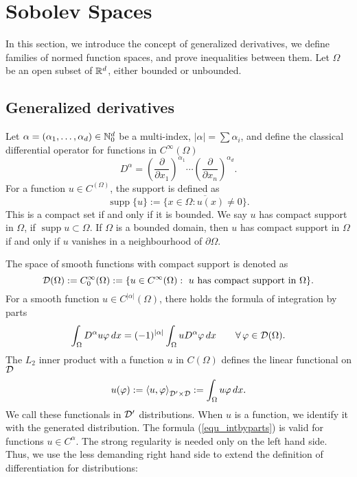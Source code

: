 \chapter{Sobolev Spaces}
\label{sec_sobolev}
%
In this section, we introduce the concept of generalized derivatives, we
define families of normed function spaces, and prove inequalities between
them.
Let $\Omega$ be an open subset of ${\mathbb R}^d$, either bounded or unbounded.

\section{Generalized derivatives}

Let $\alpha = (\alpha_1, \ldots , \alpha_d) \in {\mathbb N}_0^d$ be a multi-index,
$| \alpha | = \sum \alpha_i$, 
and define the classical differential operator for functions in $C^\infty (\Omega)$
$$
D^\alpha = 
        \left( \frac{\partial}{\partial x_1} \right)^{\alpha_1} \cdots
        \left( \frac{\partial}{\partial x_n} \right)^{\alpha_d}.
$$
%
For a function $u \in C^(\Omega)$, the support is defined as 
$$
\operatorname{supp} \{ u \} := \overline{ \{ x \in \Omega : u(x) \neq 0 \} }.
$$
This is a compact set if and only if it is bounded. We say $u$ has
compact support in $\Omega$, if $\operatorname{supp} u \subset \Omega$.
If $\Omega$ is a bounded domain, then $u$ has compact support in $\Omega$
if and only if $u$ vanishes in a neighbourhood of $\partial \Omega$.

\medskip
\noindent
The space of smooth functions with compact support is denoted as
\begin{equation}
{\cal D} (\Omega) := C_0^\infty (\Omega) := 
\{ u \in C^\infty(\Omega) : \mbox{ $u$ has compact support in $\Omega$} \}.
\end{equation}
%
For a smooth function $u \in C^{|\alpha|}(\Omega)$, there holds the
formula of integration by parts
\begin{equation} \label{equ_intbyparts}
\int_\Omega D^\alpha u \varphi \, dx = (-1)^{|\alpha|} \int_\Omega u D^\alpha \varphi \, dx 
\qquad \forall \, \varphi \in {\cal D}(\Omega).
\end{equation}
The $L_2$ inner product with a function $u$ in $C(\Omega)$ defines the linear
functional on ${\cal D}$
$$
u(\varphi) := \left< u, \varphi \right>_{{\cal D}^\prime \times {\cal D}} := \int_\Omega u \varphi \, dx.
$$
We call these functionals in ${\cal D}^\prime$ distributions.
When $u$ is a function, we identify it with the generated distribution.
The formula (\ref{equ_intbyparts}) is valid for functions $u \in C^\alpha$.
The strong regularity is needed only on the left hand side. Thus, we use
the less demanding right hand side to extend the definition of differentiation
for distributions:

